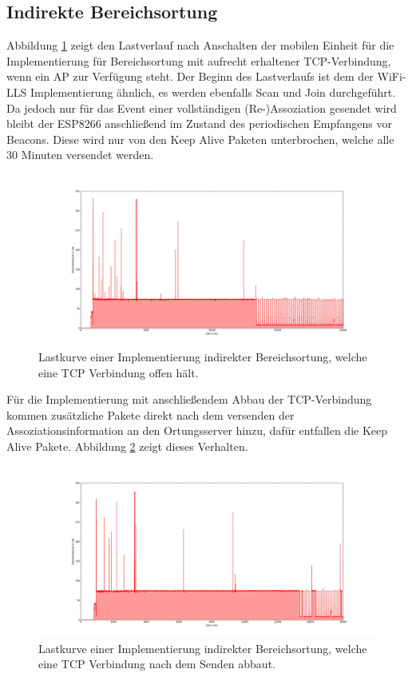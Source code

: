 \subsection{Indirekte Bereichsortung}
\label{ch:realworld:sec:indirekt}
Abbildung \ref{fig:tcphold} zeigt den Lastverlauf nach Anschalten der mobilen Einheit für die Implementierung für Bereichsortung mit aufrecht erhaltener TCP-Verbindung, wenn ein AP zur Verfügung steht. 
Der Beginn des Lastverlaufs ist dem der WiFi-LLS Implementierung ähnlich, es werden ebenfalls Scan und Join durchgeführt.
Da jedoch nur für das Event einer vollständigen (Re-)Assoziation gesendet wird bleibt der ESP8266 anschließend im Zustand des periodischen Empfangens vor Beacons.
Diese wird nur von den Keep Alive Paketen unterbrochen, welche alle 30 Minuten versendet werden.\\

\begin{figure}[h!]
  \centering
	\includegraphics[width=\textwidth]{plots/tcphold.png}
  \caption{Lastkurve einer Implementierung indirekter Bereichsortung, welche eine TCP Verbindung offen hält.}
  \label{fig:tcphold}
\end{figure}

Für die Implementierung mit anschließendem Abbau der TCP-Verbindung kommen zusätzliche Pakete direkt nach dem versenden der Assoziationsinformation an den Ortungsserver hinzu, dafür entfallen die Keep Alive Pakete.
Abbildung \ref{fig:tcpdisco} zeigt dieses Verhalten.\\

\begin{figure}[h!]
  \centering
	\includegraphics[width=\textwidth]{plots/tcpdisco.png}
  \caption{Lastkurve einer Implementierung indirekter Bereichsortung, welche eine TCP Verbindung nach dem Senden abbaut.}
  \label{fig:tcpdisco}
\end{figure}

